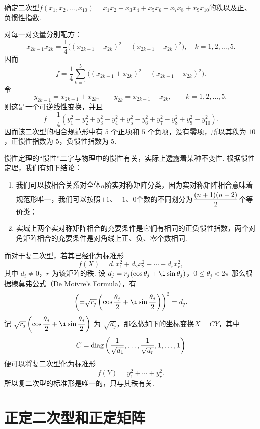 \begin{example}{}{}
    确定二次型$f(x_1,x_2,\ldots,x_{10})=x_1x_2+x_3x_4+x_5x_6+x_7x_8+x_9x_{10}$的秩以及正、负惯性指数.
\end{example}

\begin{solution}
    对每一对变量分别配方：
    \[
        x_{2k-1}x_{2k}=\frac{1}{4}\bigl((x_{2k-1}+x_{2k})^2-(x_{2k-1}-x_{2k})^2\bigr), \quad k=1,2,\ldots,5.
    \]
    因而
    \[
        f=\frac{1}{4}\sum_{k=1}^5\bigl((x_{2k-1}+x_{2k})^2-(x_{2k-1}-x_{2k})^2\bigr).
    \]
    令
    \[
        y_{2k-1}=x_{2k-1}+x_{2k}, \qquad y_{2k}=x_{2k-1}-x_{2k}, \qquad k=1,2,\ldots,5,
    \]
    则这是一个可逆线性变换，并且
    \[
        f=\frac{1}{4}(y_1^2-y_2^2+y_3^2-y_4^2+y_5^2-y_6^2+y_7^2-y_8^2+y_9^2-y_{10}^2).
    \]
    因而该二次型的相合规范形中有 $5$ 个正项和 $5$ 个负项，没有零项，所以其秩为 $10$，正惯性指数为 $5$，负惯性指数为 $5$.
\end{solution}

惯性定理的``惯性''二字与物理中的惯性有关，实际上透露着某种不变性. 根据惯性定理，我们有如下结论：
\begin{enumerate}
    \item 我们可以按相合关系对全体$n$阶实对称矩阵分类，因为实对称矩阵相合意味着规范形唯一，我们可以按照$+1$、$-1$、0个数的不同划分为$\vphantom{\cfrac{n+1}{2}}\dfrac{(n+1)(n+2)}{2}$个等价类；

    \item 实域上两个实对称矩阵相合的充要条件是它们有相同的正负惯性指数，两个对角矩阵相合的充要条件是对角线上正、负、零个数相同.
\end{enumerate}

而对于复二次型，若其已经化为标准形
\[
    f(X) = d_1x_1^2 + d_2x_2^2 + \cdots + d_rx_r^2,
\]
其中 $d_i \neq 0$，$r$ 为该矩阵的秩. 设 $d_j = r_j(\cos \theta_j + \i \sin \theta_j)$，$0 \leqslant \theta_j < 2 \pi$ 那么根据棣莫弗公式（De Moivre's Formula），有
\[
    \left(\pm \sqrt{r_j}\left(\cos \dfrac{\theta_j}{2} + \i \sin \dfrac{\theta_j}{2}\right)\right)^2 = d_j.
\]
记 $\sqrt{r_j}\left(\cos \dfrac{\theta_j}{2} + \i \sin \dfrac{\theta_j}{2}\right)$ 为 $\sqrt{d_j}$，那么做如下的坐标变换$X=CY$，其中
\[C = \operatorname{diag}\left(\dfrac{1}{\sqrt{d_1}}, \ldots, \dfrac{1}{\sqrt{d_r}}, 1, \ldots, 1\right)\]
便可以将复二次型化为标准形
\[
    f(Y) = y_1^2 + \cdots + y_r^2.
\]
所以复二次型的标准形是唯一的，只与其秩有关.

\section{正定二次型和正定矩阵}


